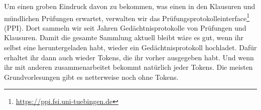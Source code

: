 Um einen groben Eindruck davon zu bekommen, was einen in den Klausuren und
mündlichen Prüfungen erwartet, verwalten wir das
Pr\"ufungsprotokolleinterface\footnote{\url{https://ppi.fsi.uni-tuebingen.de}}
(PPI).  Dort sammeln wir seit Jahren Ged\"achtnisprotokolle von Prüfungen und
Klausuren.  Damit die gesamte Sammlung aktuell bleibt wäre es gut, wenn ihr
selbst eine heruntergeladen habt, wieder ein Gedächtnisprotokoll hochladet.
Dafür erhaltet ihr dann auch wieder Tokens, die ihr vorher ausgegeben habt. Und
wenn ihr mit anderen zusammenarbeitet bekommt natürlich jeder Tokens.  Die
meisten Grundvorlesungen gibt es netterweise noch ohne Tokens.


